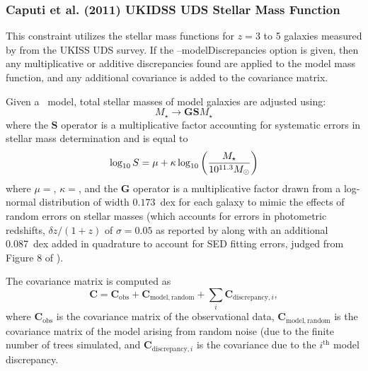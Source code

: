 \subsubsection{Caputi et al. (2011) UKIDSS UDS Stellar Mass Function}\label{sec:ConstraintsUKIDSSUDSStellarMassFunction}

This constraint utilizes the stellar mass functions for $z = 3$ to 5 galaxies measured by \cite{caputi_stellar_2011} from the UKISS UDS survey.  If the {\normalfont \ttfamily --modelDiscrepancies} option is given, then any multiplicative or additive discrepancies found are applied to the model mass function, and any additional covariance is added to the covariance matrix.

Given a \glc\ model, total stellar masses of model galaxies are adjusted using:
\begin{equation}
 M_\star \rightarrow \mathbf{G} \mathbf{S} M_\star 
\end{equation}
where the $\mathbf{S}$ operator is a multiplicative factor accounting for systematic errors in stellar mass determination and is equal to \citep{behroozi_comprehensive_2010}
\begin{equation}
 \log_\mathrm{10} S = \mu + \kappa \log_\mathrm{10} \left({M_\star \over 10^{11.3}M_\odot}\right)
\end{equation}
where $\mu=${\normalfont {}}, $\kappa=${\normalfont {}}, and the {\normalfont \bfseries G} operator is a multiplicative factor drawn from a log-normal distribution of width $0.173$~dex for each galaxy to mimic the effects of random errors on stellar masses (which accounts for errors in photometric redshifts, $\delta z/(1+z)$ of $\sigma=0.05$ as reported by \cite{caputi_stellar_2011} along with an additional 0.087~dex added in quadrature to account for SED fitting errors, judged from Figure 8 of \cite{caputi_stellar_2011}).

The covariance matrix is computed as
\begin{equation}
 \mathbf{C} = \mathbf{C}_\mathrm{obs} + \mathbf{C}_\mathrm{model,random} + \sum_i \mathbf{C}_{\mathrm{discrepancy}, i},
\end{equation}
where $\mathbf{C}_\mathrm{obs}$ is the covariance matrix of the observational data, $\mathbf{C}_\mathrm{model,random}$ is the covariance matrix of the model arising from random noise (due to the finite number of trees simulated, and $\mathbf{C}_{\mathrm{discrepancy}, i}$ is the covariance due to the $i^\mathrm{th}$ model discrepancy.


